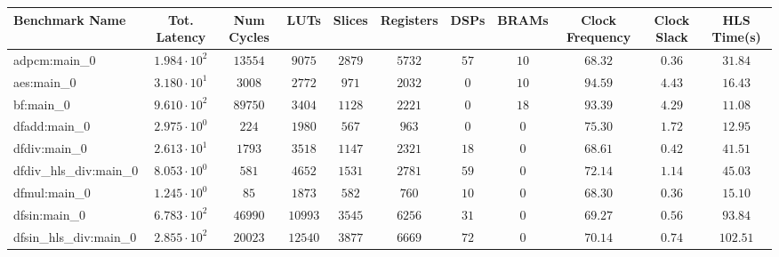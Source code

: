 \begin{tabular}{|l|c|c|c|c|c|c|c|c|c|c|}
\hline
Benchmark Name          & Tot. Latency           & Num Cycles & LUTs      & Slices    & Registers & DSPs    & BRAMs   & Clock Frequency & Clock Slack & HLS Time(s) \\
\hline
adpcm:main\_0           & $ 1.984 \cdot 10^{2} $ & $ 13554  $ & $ 9075  $ & $ 2879  $ & $ 5732  $ & $ 57  $ & $ 10  $ & $ 68.32       $ & $ 0.36    $ & $ 31.84   $ \\
aes:main\_0             & $ 3.180 \cdot 10^{1} $ & $ 3008   $ & $ 2772  $ & $ 971   $ & $ 2032  $ & $ 0   $ & $ 10  $ & $ 94.59       $ & $ 4.43    $ & $ 16.43   $ \\
bf:main\_0              & $ 9.610 \cdot 10^{2} $ & $ 89750  $ & $ 3404  $ & $ 1128  $ & $ 2221  $ & $ 0   $ & $ 18  $ & $ 93.39       $ & $ 4.29    $ & $ 11.08   $ \\
dfadd:main\_0           & $ 2.975 \cdot 10^{0} $ & $ 224    $ & $ 1980  $ & $ 567   $ & $ 963   $ & $ 0   $ & $ 0   $ & $ 75.30       $ & $ 1.72    $ & $ 12.95   $ \\
dfdiv:main\_0           & $ 2.613 \cdot 10^{1} $ & $ 1793   $ & $ 3518  $ & $ 1147  $ & $ 2321  $ & $ 18  $ & $ 0   $ & $ 68.61       $ & $ 0.42    $ & $ 41.51   $ \\
dfdiv\_hls\_div:main\_0 & $ 8.053 \cdot 10^{0} $ & $ 581    $ & $ 4652  $ & $ 1531  $ & $ 2781  $ & $ 59  $ & $ 0   $ & $ 72.14       $ & $ 1.14    $ & $ 45.03   $ \\
dfmul:main\_0           & $ 1.245 \cdot 10^{0} $ & $ 85     $ & $ 1873  $ & $ 582   $ & $ 760   $ & $ 10  $ & $ 0   $ & $ 68.30       $ & $ 0.36    $ & $ 15.10   $ \\
dfsin:main\_0           & $ 6.783 \cdot 10^{2} $ & $ 46990  $ & $ 10993 $ & $ 3545  $ & $ 6256  $ & $ 31  $ & $ 0   $ & $ 69.27       $ & $ 0.56    $ & $ 93.84   $ \\
dfsin\_hls\_div:main\_0 & $ 2.855 \cdot 10^{2} $ & $ 20023  $ & $ 12540 $ & $ 3877  $ & $ 6669  $ & $ 72  $ & $ 0   $ & $ 70.14       $ & $ 0.74    $ & $ 102.51  $ \\

\end{tabular}
